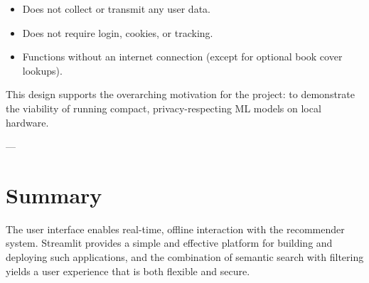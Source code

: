 \begin{itemize}
    \item Does not collect or transmit any user data.
    \item Does not require login, cookies, or tracking.
    \item Functions without an internet connection (except for optional book cover lookups).
\end{itemize}

This design supports the overarching motivation for the project: to demonstrate the viability of running compact, privacy-respecting ML models on local hardware.

---

\section{Summary}
\label{sec:ui-summary}

The user interface enables real-time, offline interaction with the recommender system. Streamlit provides a simple and effective platform for building and deploying such applications, and the combination of semantic search with filtering yields a user experience that is both flexible and secure.

